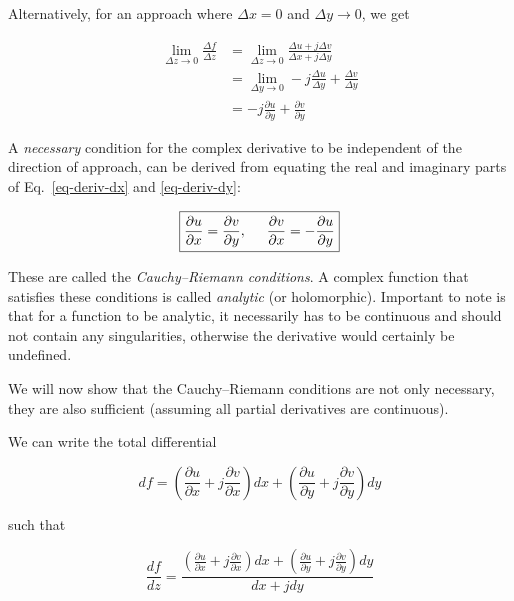 Alternatively, for an approach where $\Delta x = 0$ and $\Delta y \to 0$, we get

\begin{align}
\lim_{\Delta z \to 0} \frac{\Delta f}{\Delta z}
& = \lim_{\Delta z \to 0} \frac{\Delta u + j \Delta v}{\Delta x + j \Delta y}
\nonumber \\
& = \lim_{\Delta y \to 0} -j\frac{\Delta u}{\Delta y} +  \frac{\Delta v}{\Delta
y} \nonumber \\
& = -j\frac{\partial u}{\partial y} +  \frac{\partial v}{\partial
y}\label{eq-deriv-dy}
\end{align}

A \emph{necessary} condition for the complex derivative to be independent of the
direction of approach, can be derived from equating the real and imaginary parts
of Eq.~\ref{eq-deriv-dx} and \ref{eq-deriv-dy}:

\begin{equation}
\fbox{$\displaystyle
\frac{\partial u}{\partial x} = \frac{\partial v}{\partial y}, \hspace{.5cm}
\frac{\partial v}{\partial x} = -\frac{\partial u}{\partial y}
\label{eq-Cauchy-Riemann}
$}
\end{equation} 

These are called the \emph{Cauchy--Riemann conditions}. A complex function that
satisfies these conditions is called \emph{analytic} (or holomorphic). Important
to note is that for a function to be analytic, it necessarily has to be
continuous and should not contain any singularities, otherwise the derivative
would certainly be undefined.

We will now show that the Cauchy--Riemann conditions are not only necessary,
they are also sufficient (assuming all partial derivatives are continuous). 

We can write the total differential

\begin{equation}
d f = \left( \frac{\partial u}{\partial x}+j\frac{\partial v}{\partial x}\right)
d x+\left(\frac{\partial u}{\partial y}+j\frac{\partial v}{\partial y}\right) d
y
\end{equation} 

such that

\begin{equation}
\frac{d f}{d z} = \frac{\left(\frac{\partial u}{\partial x}+j\frac{\partial
v}{\partial x}\right) d x+\left(\frac{\partial u}{\partial y}+j\frac{\partial
v}{\partial y}\right) d y}{d x + j d y}
\end{equation} 

